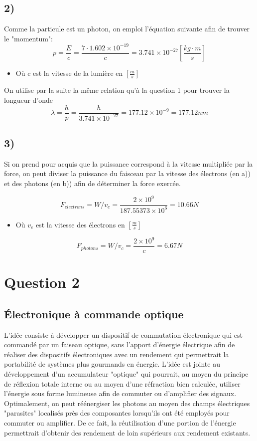 \section{2)}
Comme la particule est un photon, on emploi l'équation suivante afin de trouver le "momentum":
\begin{equation}
p = \frac{E}{c} = \frac{7 \cdot 1.602\times 10^{-19}}{c} = 3.741\times 10^{-27} \left[\frac{kg \cdot m}{s}\right]
\end{equation}
\begin{itemize}
\item Où c est la vitesse de la lumière en $\left[\frac{m}{s}\right]$
\end{itemize}

On utilise par la suite la même relation qu'à la question 1 pour trouver la longueur d'onde
\begin{equation}
\lambda = \frac{h}{p} = \frac{h}{3.741\times 10^{-27}} = 177.12\times 10^{-9} = 177.12nm
\end{equation}
\section{3)}
Si on prend pour acquis que la puissance correspond à la vitesse multipliée par la force, on peut diviser la puissance du faisceau par la vitesse des électrons (en a)) et des photons (en b)) afin de déterminer la force exercée.

\begin{equation}
F_{electrons} = W/v_e = \frac{2 \times 10^9}{187.55373\times 10^{6}} = 10.66N
\end{equation}
\begin{itemize}
\item Où $v_e$ est la vitesse des électrons en $\left[\frac{m}{s}\right]$
\end{itemize}

\begin{equation}
F_{photons} = W/v_{c} = \frac{2 \times 10^9}{c} = 6.67N
\end{equation}
\chapter{Question 2}
\section{Électronique à commande optique}
L'idée consiste à développer un dispositif de commutation électronique qui est commandé par un faiseau optique, sans l'apport d'énergie électrique afin de réaliser des dispositifs électroniques avec un rendement qui permettrait la portabilité de systèmes plus gourmands en énergie. L'idée est jointe au développement d'un accumulateur "optique" qui pourrait, au moyen du principe de réflexion totale interne ou au moyen d'une réfraction bien calculée, utiliser l'énergie sous forme lumineuse afin de commuter ou d'amplifier des signaux. Optimalement, on peut réénergiser les photons au moyen des champs électriques "parasites" localisés près des composantes lorsqu'ils ont été employés pour commuter ou amplifier. De ce fait, la réutilisation d'une portion de l'énergie permettrait d'obtenir des rendement de loin supérieurs aux rendement existants.
